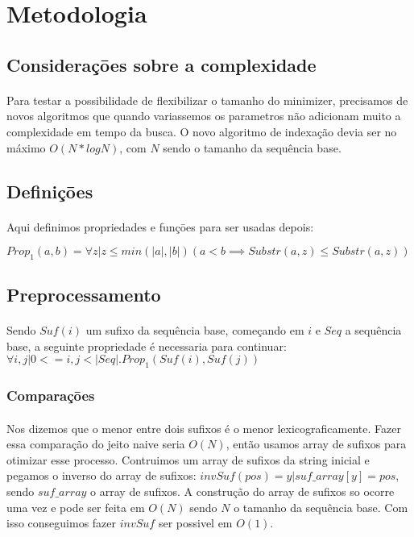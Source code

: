 \documentclass{article}
\begin{document}
\section{Metodologia}
\subsection{Consideraçōes sobre a complexidade}
\paragraph{}{Para testar a possibilidade de flexibilizar o tamanho do minimizer, precisamos de novos algoritmos que quando variassemos os parametros não adicionam muito a complexidade em tempo da busca. O novo algoritmo de indexação devia ser no máximo \(O(N * logN)\), com \(N\) sendo o tamanho da sequência base.} 
\subsection{Definiçōes}
\paragraph{}{Aqui definimos propriedades e funçōes para ser usadas depois:}

\(Prop_1(a, b) = \forall z | z \leq min(|a|,|b|) (a < b \implies Substr(a, z) \leq Substr(a, z) )\)

\subsection{Preprocessamento}
\paragraph{}{Sendo \(Suf(i)\) um sufixo da sequência base, começando em \(i\) e \(Seq\) a sequência base, a seguinte propriedade é necessaria para continuar: \(\forall{i, j} | 0 <= i, j < |Seq|. Prop_1(Suf(i), Suf(j)) \)}
\subsubsection{Comparaçōes}
\paragraph{}{Nos dizemos que o menor entre dois sufixos é o menor lexicograficamente. Fazer essa comparação do jeito naive seria \(O(N)\), então usamos array de sufixos para otimizar esse processo. Contruimos um array de sufixos da string inicial e pegamos o inverso do array de sufixos: \(invSuf(pos) = y | suf\_array[y] = pos\), sendo \(suf\_array\) o array de sufixos. A construção do array de sufixos so ocorre uma vez e pode ser feita em \(O(N)\) sendo \(N\) o tamanho da sequência base. Com isso conseguimos fazer \(invSuf\) ser possivel em \(O(1)\).} 
\end{document}
